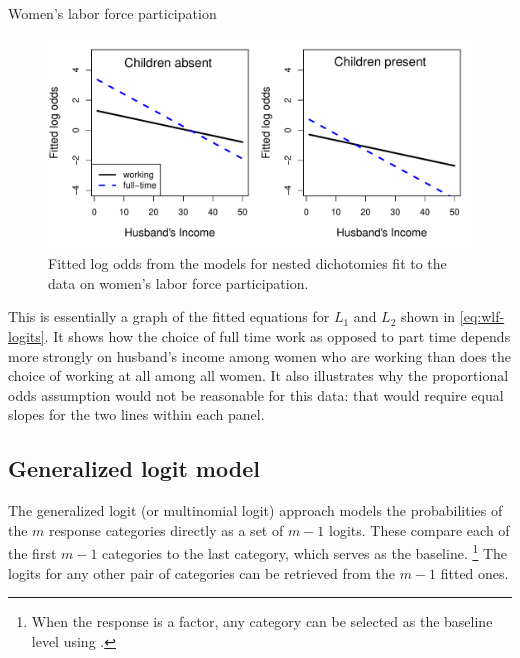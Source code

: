 \documentclass[11pt]{book}\usepackage[]{graphicx}\usepackage[]{color}
\newenvironment{knitrout}{}{} %
\renewenvironment{knitrout}{\small\renewcommand{\baselinestretch}{.85}}{} %
\begin{document}
\begin{Example}[wlfpart1]{Women's labor force participation}
\begin{knitrout}
\begin{figure}[!htbp]
\centerline{\includegraphics[width=.9\textwidth]{ch07/fig/wlf-fitted-logit-1} }

\caption[Fitted log odds from the models for nested dichotomies fit to the data on women's labor force participation]{Fitted log odds from the models for nested dichotomies fit to the data on women's labor force participation.\label{fig:wlf-fitted-logit}}
\end{figure}


\end{knitrout}
This is essentially a
graph of the fitted equations for $L_1$ and $L_2$ shown in 
\eqref{eq:wlf-logits}.  It shows how the choice of full time
work as opposed to part time depends more strongly on husband's
income among women who are working than does the choice of
working at all among all women.  It also illustrates why the
proportional odds assumption would not be reasonable for this
data: that would require equal slopes for the two lines within
each panel.


\end{Example}

\subsection{Generalized logit model}\label{sec:genlogit}

The generalized logit (or multinomial logit)
approach 
models the probabilities of the $m$ response categories directly as a set of \(m - 1\) logits.  These compare
each of the first \(m - 1\) categories to the last category, which serves
as the baseline.%
\footnote{
When the response is a factor, any category can be selected as the
baseline level using .
}
The logits for any other pair of categories can be retrieved
from the \(m - 1\) fitted ones.
\end{document}
